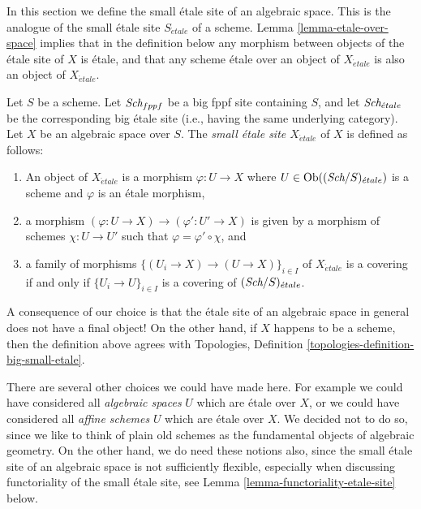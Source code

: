 \noindent
In this section we define the small \'etale site of an algebraic space.
This is the analogue of the small \'etale site $S_{\acute{e}tale}$ of a scheme.
Lemma \ref{lemma-etale-over-space} implies that in the definition below
any morphism between objects of the \'etale site of $X$ is \'etale, and that
any scheme \'etale over an object of $X_{\acute{e}tale}$ is also an object of
$X_{\acute{e}tale}$.

\begin{definition}
\label{definition-etale-site}
Let $S$ be a scheme.
Let $\textit{Sch}_{fppf}$ be a big fppf site containing $S$,
and let $\textit{Sch}_{\acute{e}tale}$ be the corresponding big \'etale site
(i.e., having the same underlying category).
Let $X$ be an algebraic space over $S$.
The {\it small \'etale site $X_{\acute{e}tale}$} of $X$ is defined as follows:
\begin{enumerate}
\item An object of $X_{\acute{e}tale}$ is a morphism $\varphi : U \to X$
where $U \in \mathop{\rm Ob}\nolimits((\textit{Sch}/S)_{\acute{e}tale})$ is a scheme and
$\varphi$ is an \'etale morphism,
\item a morphism $(\varphi : U \to X) \to (\varphi' : U' \to X)$
is given by a morphism of schemes $\chi : U \to U'$ such that
$\varphi = \varphi' \circ \chi$, and
\item a family of morphisms $\{(U_i \to X) \to (U \to X)\}_{i \in I}$
of $X_{\acute{e}tale}$ is a covering if and only if $\{U_i \to U\}_{i \in I}$
is a covering of $(\textit{Sch}/S)_{\acute{e}tale}$.
\end{enumerate}
\end{definition}

\noindent
A consequence of our choice is that the \'etale site of an algebraic space
in general does not have a final object! On the other hand, if $X$ happens
to be a scheme, then the definition above agrees with
Topologies, Definition \ref{topologies-definition-big-small-etale}.

\medskip\noindent
There are several other choices we could have made here. For example
we could have considered all {\it algebraic spaces} $U$ which are \'etale
over $X$, or we could have considered all {\it affine schemes} $U$ which
are \'etale over $X$. We decided not to do so, since we like to think of
plain old schemes as the fundamental objects of algebraic geometry. On
the other hand, we do need these notions also, since the small \'etale site
of an algebraic space is not sufficiently flexible, especially when
discussing functoriality of the small \'etale site, see
Lemma \ref{lemma-functoriality-etale-site}
below.

